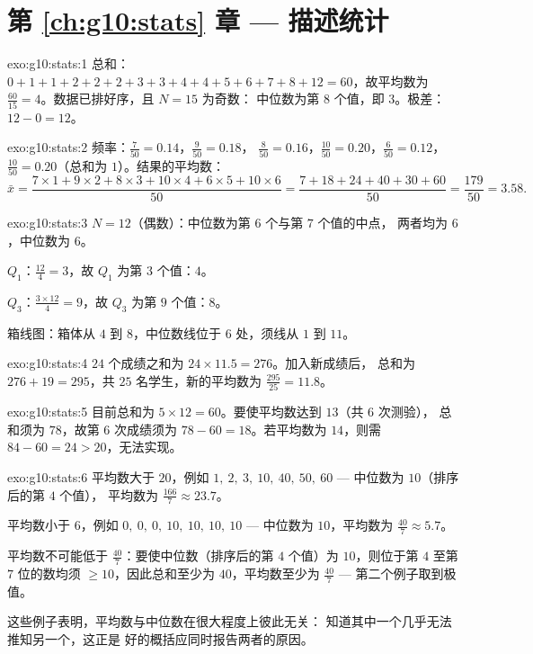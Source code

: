 \section*{第 \ref{ch:g10:stats} 章 --- 描述统计}

\begin{solution}{exo:g10:stats:1}
总和：$0+1+1+2+2+2+3+3+4+4+5+6+7+8+12 = 60$，故平均数为
$\frac{60}{15} = 4$。数据已排好序，且 $N = 15$ 为奇数：
中位数为第 $8$ 个值，即 $3$。极差：$12 - 0 = 12$。
\end{solution}

\begin{solution}{exo:g10:stats:2}
频率：$\frac{7}{50} = 0.14$，$\frac{9}{50} = 0.18$，
$\frac{8}{50} = 0.16$，$\frac{10}{50} = 0.20$，$\frac{6}{50} = 0.12$，
$\frac{10}{50} = 0.20$（总和为 $1$）。结果的平均数：
\[
\bar x = \frac{7 \times 1 + 9 \times 2 + 8 \times 3 + 10 \times 4
+ 6 \times 5 + 10 \times 6}{50}
= \frac{7 + 18 + 24 + 40 + 30 + 60}{50}
= \frac{179}{50} = 3.58 .
\]
\end{solution}

\begin{solution}{exo:g10:stats:3}
$N = 12$（偶数）：中位数为第 $6$ 个与第 $7$ 个值的中点，
两者均为 $6$，中位数为 $6$。

$Q_1$：$\frac{12}{4} = 3$，故 $Q_1$ 为第 $3$ 个值：$4$。

$Q_3$：$\frac{3 \times 12}{4} = 9$，故 $Q_3$ 为第 $9$ 个值：$8$。

箱线图：箱体从 $4$ 到 $8$，中位数线位于 $6$ 处，须线从
$1$ 到 $11$。
\end{solution}

\begin{solution}{exo:g10:stats:4}
$24$ 个成绩之和为 $24 \times 11.5 = 276$。加入新成绩后，
总和为 $276 + 19 = 295$，共 $25$ 名学生，新的平均数为
$\frac{295}{25} = 11.8$。
\end{solution}

\begin{solution}{exo:g10:stats:5}
目前总和为 $5 \times 12 = 60$。要使平均数达到 $13$（共 $6$ 次测验），
总和须为 $78$，故第 $6$ 次成绩须为 $78 - 60 = 18$。若平均数为
$14$，则需 $84 - 60 = 24 > 20$，无法实现。
\end{solution}

\begin{solution}{exo:g10:stats:6}
平均数大于 $20$，例如
$1,\ 2,\ 3,\ 10,\ 40,\ 50,\ 60$ --- 中位数为 $10$（排序后的第 $4$ 个值），
平均数为 $\frac{166}{7} \approx 23.7$。

平均数小于 $6$，例如
$0,\ 0,\ 0,\ 10,\ 10,\ 10,\ 10$ --- 中位数为 $10$，平均数为
$\frac{40}{7} \approx 5.7$。

平均数不可能低于 $\frac{40}{7}$：要使中位数（排序后的第 $4$
个值）为 $10$，则位于第 $4$ 至第 $7$ 位的数均须
$\geq 10$，因此总和至少为 $40$，平均数至少为
$\frac{40}{7}$ --- 第二个例子取到极值。

这些例子表明，平均数与中位数在很大程度上彼此无关：
知道其中一个几乎无法推知另一个，这正是
好的概括应同时报告两者的原因。
\end{solution}

